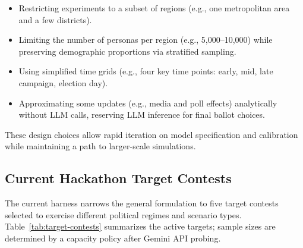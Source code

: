 \documentclass[11pt]{article}
\begin{document}
\begin{itemize}
  \item Restricting experiments to a subset of regions (e.g., one metropolitan area and a few districts).
  \item Limiting the number of personas per region (e.g., 5,000--10,000) while preserving demographic proportions via stratified sampling.
  \item Using simplified time grids (e.g., four key time points: early, mid, late campaign, election day).
  \item Approximating some updates (e.g., media and poll effects) analytically without LLM calls, reserving LLM inference for final ballot choices.
\end{itemize}

These design choices allow rapid iteration on model specification and calibration while maintaining a path to larger-scale simulations.

\subsection{Current Hackathon Target Contests}

The current harness narrows the general formulation to five target contests selected to exercise different political regimes and scenario types. Table~\ref{tab:target-contests} summarizes the active targets; sample sizes are determined by a capacity policy after Gemini API probing.
\end{document}
